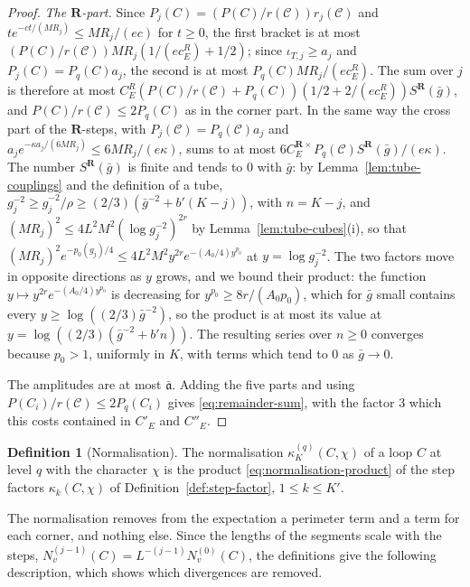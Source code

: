 \documentclass[11pt]{preprint}
\numberwithin{equation}{section}
\theoremstyle{definition}
\newtheorem{definition}[theorem]{Definition}
\theoremstyle{remark}
\theoremstyle{plain}
\begin{document}
\begin{proof}
\emph{The $\mathbf R$-part.} Since $P_j(C) = (P(C)/r(\mathcal C))r_j(\mathcal C)$ and $te^{-ct/(MR_j)} \leq MR_j/(ec)$ for $t \geq 0$, the first bracket is at most $(P(C)/r(\mathcal C))MR_j(1/(ec^R_E) + 1/2)$; since $\iota_{T,j} \geq a_j$ and $P_j(C) = P_q(C)a_j$, the second is at most $P_q(C)MR_j/(ec^R_E)$. The sum over $j$ is therefore at most $C^R_E(P(C)/r(\mathcal C) + P_q(C))(1/2 + 2/(ec^R_E))S^{\mathbf R}(\bar g)$, and $P(C)/r(\mathcal C) \leq 2P_q(C)$ as in the corner part. In the same way the cross part of the $\mathbf R$-steps, with $P_j(\mathcal C) = P_q(\mathcal C)a_j$ and $a_je^{-\kappa a_j/(6MR_j)} \leq 6MR_j/(e\kappa)$, sums to at most $6C^{\mathbf R\times}_EP_q(\mathcal C)S^{\mathbf R}(\bar g)/(e\kappa)$. The number $S^{\mathbf R}(\bar g)$ is finite and tends to $0$ with $\bar g$: by Lemma~\ref{lem:tube-couplings} and the definition of a tube, $g_j^{-2} \geq \hat g_j^{-2}/\rho \geq (2/3)(\bar g^{-2} + b'(K - j))$, with $n = K - j$, and $(MR_j)^2 \leq 4L^2M^2(\log g_j^{-2})^{2r}$ by Lemma~\ref{lem:tube-cubes}(i), so that $(MR_j)^2e^{-p_0(g_j)/4} \leq 4L^2M^2y^{2r}e^{-(A_0/4)y^{p_0}}$ at $y = \log g_j^{-2}$. The two factors move in opposite directions as $y$ grows, and we bound their product: the function $y \mapsto y^{2r}e^{-(A_0/4)y^{p_0}}$ is decreasing for $y^{p_0} \geq 8r/(A_0p_0)$, which for $\bar g$ small contains every $y \geq \log((2/3)\bar g^{-2})$, so the product is at most its value at $y = \log((2/3)(\bar g^{-2} + b'n))$. The resulting series over $n \geq 0$ converges because $p_0 > 1$, uniformly in $K$, with terms which tend to $0$ as $\bar g \to 0$.

The amplitudes are at most $\bar{\mathfrak a}$. Adding the five parts and using $P(C_i)/r(\mathcal C) \leq 2P_q(C_i)$ gives \eqref{eq:remainder-sum}, with the factor $3$ which this costs contained in $C'_E$ and $C''_E$.
\end{proof}

\begin{definition}[Normalisation]\label{def:normalisation}
The normalisation $\kappa_K^{(q)}(C, \chi)$ of a loop $C$ at level $q$ with the character $\chi$ is the product \eqref{eq:normalisation-product} of the step factors $\kappa_k(C, \chi)$ of Definition~\ref{def:step-factor}, $1 \leq k \leq K'$.
\end{definition}

The normalisation removes from the expectation a perimeter term and a term for each corner, and nothing else. Since the lengths of the segments scale with the steps, $N^{(j-1)}_v(C) = L^{-(j-1)}N^{(0)}_v(C)$, the definitions give the following description, which shows which divergences are removed.
\end{document}
